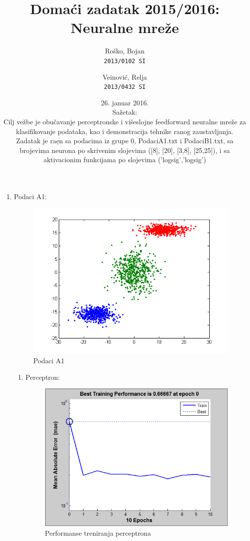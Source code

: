 \documentclass{report}
\author{
  Ro\v sko, Bojan\\
  \texttt{2013/0102 SI}
  \and
  Veinovi\' c, Relja\\
  \texttt{2013/0432 SI}
  }
\title{Doma\' ci zadatak 2015/2016:\\ Neuralne mre\v ze}
\date{26. januar 2016.\\[5\baselineskip] Sa\v zetak:\\[2\baselineskip]
Cilj ve\v zbe je obu\v cavanje perceptronske i vi\v seslojne feedforward neuralne mre\v ze za klasifikovanje podataka, kao i demonstracija tehnike ranog zaustavljanja.\\[2\baselineskip]
Zadatak je ra\d en sa podacima iz grupe 0, PodaciA1.txt i PodaciB1.txt, sa brojevima neurona po skrivenim slojevima ([8], [20], [3,8], [25,25]), i sa aktivacionim funkcijama po slojevima ('logsig','logsig')}
\begin{document}
\huge\maketitle\normalsize
\begin{enumerate}\LARGE

\item
Podaci A1:\large



\begin{center}
\begin{figure}[!h]
\includegraphics{A1input.png}
\caption{Podaci A1}
\end{figure}
\end{center}







\newpage
\begin{enumerate}
\item\LARGE
Perceptron:\large

\begin{figure}[!h]
\begin{center}
\includegraphics[scale=0.8]{A1performancePerceptron.png}
\caption{Performanse treniranja perceptrona}
\end{center}
\end{figure}


\end{enumerate}
\end{enumerate}
\end{document}
